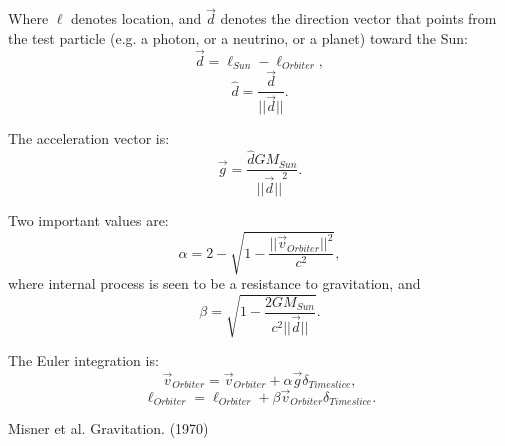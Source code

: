 \documentclass[12pt]{article}
\begin{document}
Where $\ell$ denotes location, and $\vec{d}$ denotes the direction vector that points from the test particle (e.g. a photon, or a neutrino, or a planet) toward the Sun:
\begin{equation}
\vec{d} = \ell_{Sun} - \ell_{Orbiter},	
\end{equation}
\begin{equation}
\hat{d} = \frac{\vec{d}}{\lvert\lvert \vec{d} \rvert\rvert}.
\end{equation}

The acceleration vector is:
\begin{equation}
\vec{g} =  \frac{\hat{d} G M_{Sun}}{{\lvert\lvert \vec{d} \rvert\rvert}^2}.
\end{equation}

Two important values are:
\begin{equation}
\alpha = 2 - \sqrt{1 - \frac{\lvert\lvert \vec{v}_{Orbiter}\rvert\rvert^2}{c^2}},
\end{equation}
where internal process is seen to be a resistance to gravitation, and
\begin{equation}
\beta = \sqrt{1 - \frac{2GM_{Sun}}{c^2 \lvert \lvert \vec{d} \rvert \rvert}}.
\end{equation}

The Euler integration is:
\begin{equation}
\vec{v}_{Orbiter} = \vec{v}_{Orbiter} + \alpha \vec{g} \delta_{Timeslice},
\end{equation}
\begin{equation}
\ell_{Orbiter} = \ell_{Orbiter} + \beta \vec{v}_{Orbiter} \delta_{Timeslice}.
\end{equation}






\begin{thebibliography}{9}


 Misner et al. Gravitation. (1970)






\end{thebibliography}
\end{document}
